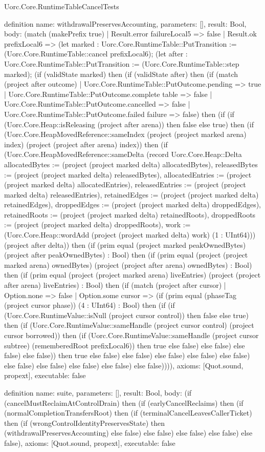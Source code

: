 \begin{lexlean}{Uorc.Core.RuntimeTableCancelTests}
\begin{semanticmodule}
definition{
  name: withdrawalPreservesAccounting,
  parameters: [],
  result: Bool,
  body: (match (makePrefix true)
    | Result.error failureLocal5 => false
    | Result.ok prefixLocal6 => (let marked : Uorc.Core.RuntimeTable::PutTransition := (Uorc.Core.RuntimeTable::cancel prefixLocal6); (let after : Uorc.Core.RuntimeTable::PutTransition := (Uorc.Core.RuntimeTable::step marked); (if (validState marked) then (if (validState after) then (if (match (project after outcome)
      | Uorc.Core.RuntimeTable::PutOutcome.pending => true
      | Uorc.Core.RuntimeTable::PutOutcome.complete table => false
      | Uorc.Core.RuntimeTable::PutOutcome.cancelled => false
      | Uorc.Core.RuntimeTable::PutOutcome.failed failure => false) then (if (if (Uorc.Core.Heap::isReleasing (project after arena)) then false else true) then (if (Uorc.Core.HeapMovedReference::sameIndex (project (project marked arena) index) (project (project after arena) index)) then (if (Uorc.Core.HeapMovedReference::sameDelta (record Uorc.Core.Heap::Delta {allocatedBytes := (project (project marked delta) allocatedBytes), releasedBytes := (project (project marked delta) releasedBytes), allocatedEntries := (project (project marked delta) allocatedEntries), releasedEntries := (project (project marked delta) releasedEntries), retainedEdges := (project (project marked delta) retainedEdges), droppedEdges := (project (project marked delta) droppedEdges), retainedRoots := (project (project marked delta) retainedRoots), droppedRoots := (project (project marked delta) droppedRoots), work := (Uorc.Core.Heap::wordAdd (project (project marked delta) work) (1 : UInt64))}) (project after delta)) then (if (prim equal (project marked peakOwnedBytes) (project after peakOwnedBytes) : Bool) then (if (prim equal (project (project marked arena) ownedBytes) (project (project after arena) ownedBytes) : Bool) then (if (prim equal (project (project marked arena) liveEntries) (project (project after arena) liveEntries) : Bool) then (if (match (project after cursor)
      | Option.none => false
      | Option.some cursor => (if (prim equal (phaseTag (project cursor phase)) (4 : UInt64) : Bool) then (if (if (Uorc.Core.RuntimeValue::isNull (project cursor control)) then false else true) then (if (Uorc.Core.RuntimeValue::sameHandle (project cursor control) (project cursor borrowed)) then (if (Uorc.Core.RuntimeValue::sameHandle (project cursor subtree) (rememberedRoot prefixLocal6)) then true else false) else false) else false) else false)) then true else false) else false) else false) else false) else false) else false) else false) else false) else false) else false)))),
  axioms: [Quot.sound, propext],
  executable: false
}

definition{
  name: suite,
  parameters: [],
  result: Bool,
  body: (if (cancelMustReclaimAtControlDrain) then (if (earlyCancelReclaims) then (if (normalCompletionTransfersRoot) then (if (terminalCancelLeavesCallerTicket) then (if (wrongControlIdentityPreservesState) then (withdrawalPreservesAccounting) else false) else false) else false) else false) else false),
  axioms: [Quot.sound, propext],
  executable: false
}
\end{semanticmodule}
\end{lexlean}
